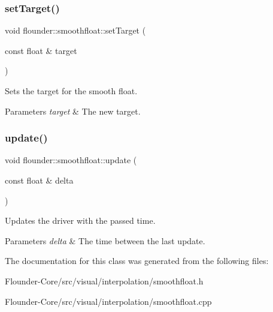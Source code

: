 \subsubsection{\texorpdfstring{set\+Target()}{setTarget()}}
{\footnotesize\ttfamily void flounder\+::smoothfloat\+::set\+Target (\begin{DoxyParamCaption}\item[{const float \&}]{target }\end{DoxyParamCaption})\hspace{0.3cm}{\ttfamily [inline]}}



Sets the target for the smooth float. 


\begin{DoxyParams}{Parameters}
{\em target} & The new target. \\
\hline
\end{DoxyParams}
\mbox{\label{classflounder_1_1smoothfloat_a38b23a64dda6597576401026725dd535}} 
\subsubsection{\texorpdfstring{update()}{update()}}
{\footnotesize\ttfamily void flounder\+::smoothfloat\+::update (\begin{DoxyParamCaption}\item[{const float \&}]{delta }\end{DoxyParamCaption})}



Updates the driver with the passed time. 


\begin{DoxyParams}{Parameters}
{\em delta} & The time between the last update. \\
\hline
\end{DoxyParams}


The documentation for this class was generated from the following files\+:\begin{DoxyCompactItemize}
\item 
Flounder-\/\+Core/src/visual/interpolation/smoothfloat.\+h\item 
Flounder-\/\+Core/src/visual/interpolation/smoothfloat.\+cpp\end{DoxyCompactItemize}
